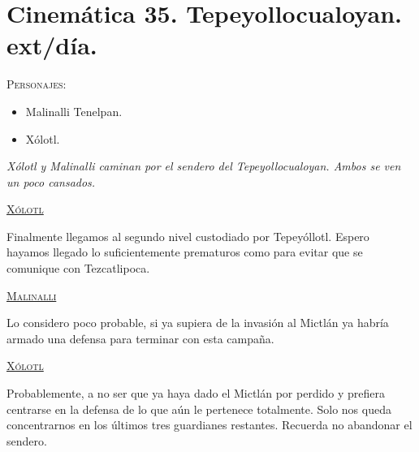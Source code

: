 \section{Cinemática 35. Tepeyollocualoyan. ext/día. }
\label{Cin:Cinematica35}
 \textsc{Personajes}:
 \begin{itemize}
 \item Malinalli Tenelpan.
\item Xólotl.
 \end{itemize}
\textit{Xólotl y Malinalli caminan por el sendero del Tepeyollocualoyan. Ambos se ven un poco cansados. }
\begin{center}
\textsc{\underline{Xólotl}}
\\
\par
Finalmente llegamos al segundo nivel custodiado por Tepeyóllotl. Espero hayamos llegado lo suficientemente prematuros como para evitar que se comunique con Tezcatlipoca.
\\
\par
\textsc{\underline{Malinalli}}
\\
\par
Lo considero poco probable, si ya supiera de la invasión al Mictlán ya habría armado una defensa para terminar con esta campaña.
\\
\par
\textsc{\underline{Xólotl}}
\\
\par
Probablemente, a no ser que ya haya dado el Mictlán por perdido y prefiera centrarse en la defensa de lo que aún le pertenece totalmente. Solo nos queda concentrarnos en los últimos tres guardianes restantes. Recuerda no abandonar el sendero.
\end{center}